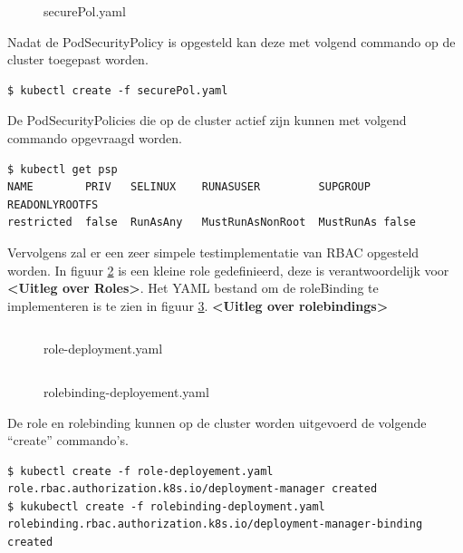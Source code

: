 \begin{figure}[h] 
	\centering
	\inputminted[fontsize=\footnotesize,linenos]{yaml}{files/securePol.yaml}
	\caption{securePol.yaml}
	\label{securePol}
\end{figure}

Nadat de PodSecurityPolicy is opgesteld kan deze met volgend commando op de cluster toegepast worden.
\begin{verbatim} 
$ kubectl create -f securePol.yaml
\end{verbatim}

De PodSecurityPolicies die op de cluster actief zijn kunnen met volgend commando opgevraagd worden.

\begin{verbatim} 
$ kubectl get psp
NAME        PRIV   SELINUX    RUNASUSER         SUPGROUP  READONLYROOTFS   
restricted  false  RunAsAny   MustRunAsNonRoot  MustRunAs false          
\end{verbatim}


Vervolgens zal er een zeer simpele testimplementatie van RBAC opgesteld worden. In figuur \ref{roleDeploy} is een kleine role gedefinieerd, deze is verantwoordelijk voor \textbf{<Uitleg over Roles>}. Het YAML bestand om de roleBinding te implementeren is te zien in figuur \ref{roleBindDeploy}. \textbf{<Uitleg over rolebindings>}
\begin{figure}[h] 
	\centering
	\inputminted[fontsize=\footnotesize,linenos]{yaml}{files/role-deployment.yaml}
	\caption{role-deployment.yaml}
	\label{roleDeploy}
\end{figure}

\begin{figure}[h] 
	\centering
	\inputminted[fontsize=\footnotesize,linenos]{yaml}{files/rolebinding-deployment.yaml}
	\caption{rolebinding-deployement.yaml}
	\label{roleBindDeploy}
\end{figure}

De role en rolebinding kunnen op de cluster worden uitgevoerd de volgende ``create'' commando's.

\begin{verbatim} 
$ kubectl create -f role-deployement.yaml
role.rbac.authorization.k8s.io/deployment-manager created
$ kukubectl create -f rolebinding-deployment.yaml
rolebinding.rbac.authorization.k8s.io/deployment-manager-binding created
\end{verbatim}




